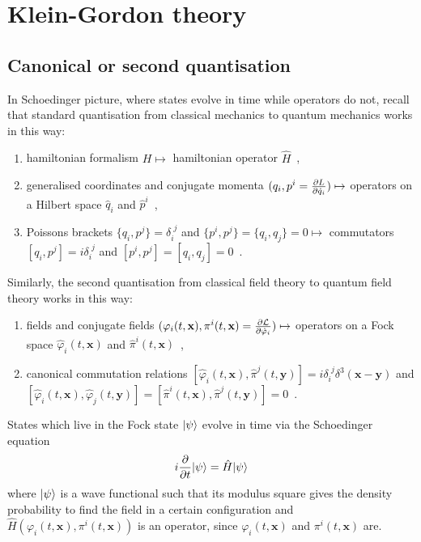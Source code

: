 \part{Klein-Gordon theory}

\chapter{Canonical or second quantisation}

    In Schoedinger picture, where states evolve in time while operators do not, recall that standard quantisation from classical mechanics to quantum mechanics works in this way: 
    \begin{enumerate}
        \item hamiltonian formalism $H \mapsto$ hamiltonian operator $\hat H$~,
        \item generalised coordinates and conjugate momenta $(q_i, p^i = \frac{\partial L}{\partial\dot q_i}) \mapsto$ operators on a Hilbert space $\hat q_i$ and $\hat p^i$~,
        \item Poissons brackets $\{q_i, p^j\} = \delta_i^{\phantom i j}$ and $\{p^i, p^j\} = \{q_i, q_j\} = 0 \mapsto$ commutators $[q_i, p^j] = i \delta_i^{\phantom i j}$ and $[p^i, p^j] = [q_i, q_j] = 0$~.
    \end{enumerate}

    Similarly, the second quantisation from classical field theory to quantum field theory works in this way:
    \begin{enumerate}
        \item fields and conjugate fields $(\varphi_i(t, \mathbf x), \pi^i (t, \mathbf x) = \frac{\partial\mathcal L}{\partial\dot \varphi_i}) \mapsto$ operators on a Fock space $\hat \varphi_i(t, \mathbf x)$ and $\hat \pi^i (t, \mathbf x)$~,
        \item canonical commutation relations $[\hat \varphi_i(t, \mathbf x), \hat \pi^j (t, \mathbf y)] = i \delta_i^{\phantom i j} \delta^3(\mathbf x - \mathbf y)$ and $[\hat \varphi_i(t, \mathbf x), \hat \varphi_j(t, \mathbf y)] = [\hat \pi^i (t, \mathbf x), \hat \pi^j (t, \mathbf y)] = 0$~.
    \end{enumerate}

    States which live in the Fock state $\vert\psi\rangle$ evolve in time via the Schoedinger equation 
    \begin{equation*}
        i \frac{\partial}{\partial t} \vert\psi\rangle = \hat H \vert\psi\rangle 
    \end{equation*}
    where $\vert\psi\rangle$ is a wave functional such that its modulus square gives the density probability to find the field in a certain configuration and $\hat H (\varphi_i(t, \mathbf x), \pi^i (t, \mathbf x))$ is an operator, since $\varphi_i(t, \mathbf x)$ and $\pi^i (t, \mathbf x)$ are.

